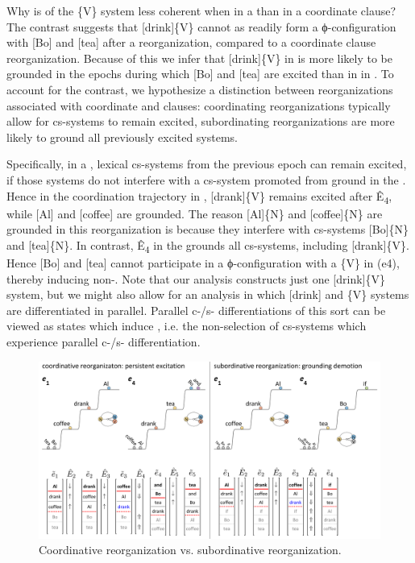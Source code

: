   Why is  of the \{V\} system less coherent when in a  than in a coordinate clause? The  contrast suggests that [drink]\{V\} cannot as readily form a ϕ-configuration with [Bo] and [tea] after a  reorganization, compared to a coordinate clause reorganization. Because of this we infer that [drink]\{V\} in  is more likely to be grounded in the epochs during which [Bo] and [tea] are excited than in in . To account for the contrast, we hypothesize a distinction between reorganizations associated with coordinate and  clauses: coordinating reorganizations typically allow for cs-systems to remain excited, subordinating reorganizations are more likely to ground all previously excited systems. 

  Specifically, in a , lexical cs-systems from the previous epoch can remain excited, if those systems do not interfere with a cs-system promoted from ground in the . Hence in the coordination trajectory in {}, [drank]\{V\} remains excited after Ê\textsubscript{4}, while [Al] and [coffee] are grounded. The reason [Al]\{N\} and [coffee]\{N\} are grounded in this reorganization is because they interfere with cs-systems [Bo]\{N\} and [tea]\{N\}. In contrast, Ê\textsubscript{4} in the  grounds all cs-systems, including [drank]\{V\}. Hence [Bo] and [tea] cannot participate in a ϕ-configuration with a \{V\} in (e4), thereby inducing non-. Note that our analysis constructs just one [drink]\{V\} system, but we might also allow for an analysis in which [drink] and \{V\} systems are differentiated in parallel. Parallel c-/s- differentiations of this sort can be viewed as states which induce , i.e. the non-selection of cs-systems which experience parallel c-/s- differentiation.

  
\begin{figure}
\includegraphics[width=\textwidth]{figures/Tilsen-img146.png}
\caption{Coordinative reorganization vs. subordinative reorganization.}
\label{fig:7:2}
\end{figure}
 

